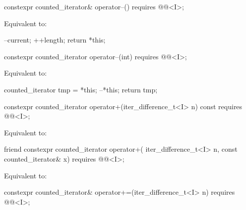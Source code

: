 %
\begin{itemdecl}
  constexpr counted_iterator& operator--()
    requires @@<I>;
\end{itemdecl}

\begin{itemdescr}
\pnum
\effects
Equivalent to:
\begin{codeblock}
--current;
++length;
return *this;
\end{codeblock}
\end{itemdescr}

%
\begin{itemdecl}
  constexpr counted_iterator operator--(int)
    requires @@<I>;
\end{itemdecl}

\begin{itemdescr}
\pnum
\effects
Equivalent to:
\begin{codeblock}
counted_iterator tmp = *this;
--*this;
return tmp;
\end{codeblock}
\end{itemdescr}

%
\begin{itemdecl}
  constexpr counted_iterator operator+(iter_difference_t<I> n) const
    requires @@<I>;
\end{itemdecl}

\begin{itemdescr}
\pnum
\effects
Equivalent to: 
\end{itemdescr}

%
\begin{itemdecl}
friend constexpr counted_iterator operator+(
  iter_difference_t<I> n, const counted_iterator& x)
    requires @@<I>;
\end{itemdecl}

\begin{itemdescr}
\pnum
\effects
Equivalent to: 
\end{itemdescr}

%
\begin{itemdecl}
  constexpr counted_iterator& operator+=(iter_difference_t<I> n)
    requires @@<I>;
\end{itemdecl}

